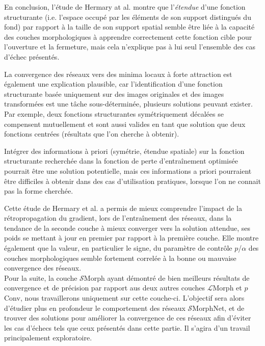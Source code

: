 \vspace{0.4mm}
En conclusion, l'étude de Hermary at al. \cite{Hermary_2022} montre que l'\textit{étendue} d'une fonction structurante (i.e. l'espace occupé par les éléments de son support distingués du fond) par rapport à la taille de son support spatial semble être liée à la capacité des couches morphologiques à apprendre correctement cette fonction cible pour l'ouverture et la fermeture, mais cela n'explique pas à lui seul l'ensemble des cas d'échec présentés. 

\vspace{3.0mm}
\noindent La convergence des réseaux vers des minima locaux à forte attraction est également une explication plausible, car l'identification d'une fonction structurante basée uniquement sur des images originales et des images transformées est une tâche sous-déterminée, plusieurs solutions peuvant exister. Par exemple, deux fonctions structurantes symétriquement décalées se compensent mutuellement et sont aussi valides en tant que solution que deux fonctions centrées (résultats que l'on cherche à obtenir). 

\vspace{3.0mm}
\noindent Intégrer des informations à priori (symétrie, étendue spatiale) sur la fonction structurante recherchée dans la fonction de perte d'entraînement optimisée pourrait être une solution potentielle, mais ces informations a priori pourraient être difficiles à obtenir dans des cas d'utilisation pratiques, lorsque l'on ne connait pas la forme cherchée.

\vspace{3.0mm}
\noindent Cette étude de Hermary et al. a permis de mieux comprendre l'impact de la rétropropagation du gradient, lors de l'entraînement des réseaux, dans la tendance de la seconde couche à mieux converger vers la solution attendue, ses poids se mettant à jour en premier par rapport à la première couche. Elle montre également que la valeur, en particulier le signe, du paramètre de contrôle $p$/$\alpha$ des couches morphologiques semble fortement correlée à la bonne ou mauvaise convergence des réseaux. \\


\vspace{0.6mm}
Pour la suite, la couche $\mathcal{S}$Morph ayant démontré de bien meilleurs résultats de convergence et de précision par rapport aus deux autres couches $\mathcal{L}$Morph et $p$Conv, nous travaillerons uniquement sur cette couche-ci. L'objectif sera alors d'étudier plus en profondeur le comportement des réseaux $\mathcal{S}$MorphNet, et de trouver des solutions pour améliorer la convergence de ces réseaux afin d'éviter les cas d'échecs tels que ceux présentés dans cette partie. Il s'agira d'un travail principalement exploratoire.

